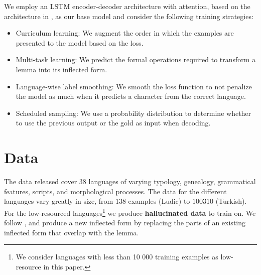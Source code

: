 \documentclass[11pt,a4paper]{article}
\begin{document}


We employ an LSTM encoder-decoder architecture with attention, based on
the architecture in , as our
base model and consider the following training strategies:

\begin{itemize}
\item Curriculum learning: We augment the order in which the examples are presented to the model based on the loss.
\item Multi-task learning: We predict the formal operations required to transform a lemma into its inflected form.
\item Language-wise label smoothing: We smooth the loss function to not penalize the model as much when it predicts a character from the correct language.
\item Scheduled sampling: We use a probability distribution to determine whether to use the previous output or the gold as input when decoding.
\end{itemize}

%


\section{Data}

The data released cover $38$ languages of varying typology, genealogy,
grammatical features, scripts, and morphological processes. The data
for the different languages vary greatly in size, from $138$ examples
(Ludic) to $100310$ (Turkish).  For the low-resourced
languages\footnote{We consider languages with less than 10 000
training examples as low-resource in this paper.} we produce
\textbf{hallucinated data} to train on. We follow
\cite{DBLP:conf/emnlp/AnastasopoulosN19}, and produce a new inflected
form by replacing the parts of an existing inflected form that
overlap with the lemma.
\end{document}
